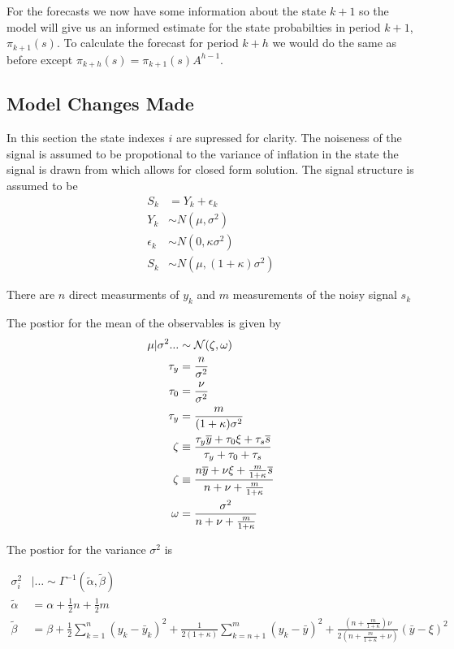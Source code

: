 \documentclass[12pt]{article}
\begin{document}
 For the forecasts we now have some information about the state $k+1$ so the model
 will give us an informed estimate for the state probabilties in period $k+1$,
 $\pi_{k+1}(s)$. To calculate the forecast for period $k+h$ we would do the same as 
 before except $\pi_{k+h}(s) = \pi_{k+1}(s) A^{h-1} $. 


\subsection*{Model Changes Made}

In this section the state indexes $i$ are supressed for clarity. 
The noiseness of the signal is assumed to be propotional to the variance of inflation in 
the state the signal is drawn from which allows for closed form solution. 
The signal structure is assumed to be 
\begin{align*}
  S_k &= Y_k + \epsilon_k \\
  Y_k &\sim N(\mu, \sigma^2)\\
  \epsilon_k &\sim N(0, \kappa \sigma^2)\\
  S_k &\sim N(\mu, (1+\kappa) \sigma^2)
\end{align*}


There are $n$ direct measurments of $y_k$ and $m$ measurements of the noisy signal
$s_k$

The postior for the mean of the observables is given by
\begin{align*}
  \mu | \sigma^2 ... &\sim \operatorname{\mathcal{N}}(\zeta, \omega ) \\
  \tau_y &= \frac{n}{\sigma^2} \\
  \tau_0 &= \frac{\nu}{\sigma^2} \\
  \tau_y &= \frac{m}{(1 + \kappa) \sigma^2}\\
  \zeta & \equiv \frac{\tau_y \overline{y} + \tau_0 \xi + \tau_s \overline{s}}{\tau_y  + \tau_0  + \tau_s}\\
  \zeta & \equiv \frac{n \overline{y} + \nu \xi + \frac{m}{1+\kappa} \overline{s}}{n + \nu + \frac{m}{1+\kappa}} \\
  \omega &= \frac{\sigma^2}{n + \nu + \frac{m}{1+\kappa}}
\end{align*}

The postior for the variance $\sigma^2$ is 

\begin{align*}
  \sigma_i^2 &| \ldots \sim \Gamma^{-1}(\tilde{\alpha}, \tilde{\beta}) \\
  \tilde{\alpha} &= \alpha +\frac{1}{2}n + \frac{1}{2}m \\
  \tilde{\beta} &= 
  \beta + \frac{1}{2} \sum_{k=1}^n(y_k - \bar{y}_k)^2 + \frac{1}{2(1+\kappa)}\sum_{k=n+1}^m(y_k - \bar{y})^2 + 
  \frac{\left(n + \frac{m}{1+\kappa}\right) \nu}{2(n + \frac{m}{1+\kappa} + \nu)}(\bar{y} - \xi)^2 
\end{align*}
\end{document}
